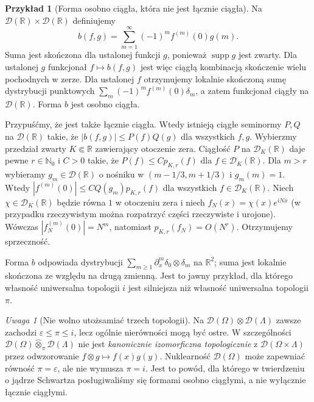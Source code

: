 \documentclass[11pt,a4paper]{article}
\numberwithin{equation}{section}
\theoremstyle{plain}
\theoremstyle{definition}
\newtheorem{przyklad}[twierdzenie]{Przykład}
\theoremstyle{remark}
\newtheorem{uwaga}[twierdzenie]{Uwaga}
\newcommand{\R}{\mathbb R}
\newcommand{\N}{\mathbb N}
\DeclareMathOperator{\supp}{supp}
\begin{document}
\begin{przyklad}[Forma osobno ciągła, która nie jest łącznie ciągła]
\label{ex:separate-not-joint24}
Na $\mathcal D(\R)\times\mathcal D(\R)$ definiujemy
\[
 b(f,g)=\sum_{m=1}^\infty (-1)^m f^{(m)}(0)g(m).
\]
Suma jest skończona dla ustalonej funkcji $g$, ponieważ
$\supp g$ jest zwarty. Dla ustalonej $g$ funkcjonał
$f\mapsto b(f,g)$ jest więc ciągłą kombinacją skończenie
wielu pochodnych w zerze. Dla ustalonej $f$ otrzymujemy
lokalnie skończoną sumę dystrybucji punktowych
$\sum_m(-1)^mf^{(m)}(0)\delta_m$, a zatem funkcjonał
ciągły na $\mathcal D(\R)$. Forma $b$ jest osobno ciągła.

Przypuśćmy, że jest także łącznie ciągła. Wtedy istnieją
ciągłe seminormy $P,Q$ na $\mathcal D(\R)$ takie, że
$|b(f,g)|\le P(f)Q(g)$ dla wszystkich $f,g$.
Wybierzmy przedział zwarty $K\Subset\R$ zawierający
otoczenie zera. Ciągłość $P$ na $\mathcal D_K(\R)$
daje pewne $r\in\N_0$ i $C>0$ takie, że
$P(f)\le Cp_{K,r}(f)$ dla $f\in\mathcal D_K(\R)$.
Dla $m>r$ wybieramy $g_m\in\mathcal D(\R)$ o nośniku
w $(m-1/3,m+1/3)$ i $g_m(m)=1$. Wtedy
$|f^{(m)}(0)|\le CQ(g_m)p_{K,r}(f)$ dla wszystkich
$f\in\mathcal D_K(\R)$. Niech $\chi\in\mathcal D_K(\R)$
będzie równa $1$ w otoczeniu zera i niech
$f_N(x)=\chi(x)e^{iNx}$ (w przypadku rzeczywistym
można rozpatrzyć części rzeczywiste i urojone).
Wówczas $|f_N^{(m)}(0)|=N^m$, natomiast
$p_{K,r}(f_N)=O(N^r)$. Otrzymujemy sprzeczność.

Forma $b$ odpowiada dystrybucji
$\sum_{m\ge1}\partial_x^m\delta_0\otimes\delta_m$
na $\R^2$; suma jest lokalnie skończona ze względu
na drugą zmienną. Jest to jawny przykład, dla którego
własność uniwersalna topologii $i$ jest silniejsza
niż własność uniwersalna topologii $\pi$.
\end{przyklad}

\begin{uwaga}[Nie wolno utożsamiać trzech topologii]
\label{rem:D-not-projective24}
Na $\mathcal D(\Omega)\otimes\mathcal D(\Lambda)$
zawsze zachodzi $\varepsilon\le\pi\le i$, lecz ogólnie
nierówności mogą być ostre. W szczególności
$\mathcal D(\Omega)\widehat\otimes_\pi\mathcal D(\Lambda)$
nie jest \emph{kanonicznie izomorficzna topologicznie}
z $\mathcal D(\Omega\times\Lambda)$ przez odwzorowanie
$f\otimes g\mapsto f(x)g(y)$. Nuklearność
$\mathcal D(\Omega)$ może zapewniać równość $\pi=\varepsilon$,
ale nie wymusza $\pi=i$. Jest to powód, dla którego
w twierdzeniu o jądrze Schwartza posługiwaliśmy się
formami osobno ciągłymi, a nie wyłącznie łącznie ciągłymi.
\end{uwaga}
\end{document}
